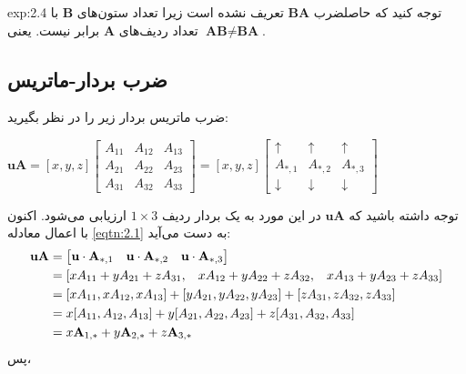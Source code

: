 {\begin{spacing}{1.5}
\begin{example}{exp:2.4}
            توجه کنید که حاصلضرب $\textbf{BA}$ تعریف نشده است زیرا تعداد ستون‌های $\textbf{B}$ با تعداد ردیف‌های $\textbf{A}$ برابر نیست. یعنی $\textbf{AB}\neq\textbf{BA}$.
        \end{example}

    \end{spacing}
}

\subsection{\textbf{ضرب بردار-ماتریس}}
\label{subsec:2.2.2}
{
    \Large
    \begin{spacing}{1.5}
        ضرب ماتریس بردار زیر را در نظر بگیرید:

        \begin{center}
            $\textbf{uA}=[x,y,z]\begin{bmatrix}
                                    A_{11} & A_{12} & A_{13} \\
                                    A_{21} & A_{22} & A_{23} \\
                                    A_{31} & A_{32} & A_{33}
            \end{bmatrix}=[x,y,z]\begin{bmatrix}
                                     \uparrow   & \uparrow   & \uparrow   \\
                                     A_{*,1}    & A_{*,2}    & A_{*,3}    \\
                                     \downarrow & \downarrow & \downarrow
            \end{bmatrix}$
        \end{center}

        توجه داشته باشید که $\textbf{uA}$ در این مورد به یک بردار ردیف $1\times 3$ ارزیابی می‌شود.
        اکنون با اعمال معادله \ref{eqtn:2.1} به دست می‌آید:
        \begin{equation*}
            \centering
            \begin{split}
                \textbf{uA}&=\begin{bmatrix}
                                 \textbf{u}\cdot\textbf{A}_{*,1} & \textbf{u}\cdot\textbf{A}_{*,2} & \textbf{u}\cdot\textbf{A}_{*,3}
                \end{bmatrix}\\
                &=[xA_{11}+yA_{21}+zA_{31},\hspace{3 mm} xA_{12}+yA_{22}+zA_{32},\hspace{3 mm} xA_{13}+yA_{23}+zA_{33}] \\
                &=[xA_{11},xA_{12},xA_{13}]+[yA_{21},yA_{22},yA_{23}]+[zA_{31},zA_{32},zA_{33}] \\
                &=x[A_{11},A_{12},A_{13}]+y[A_{21},A_{22},A_{23}]+z[A_{31},A_{32},A_{33}] \\
                &=x\textbf{A}_{1,*}+y\textbf{A}_{2,*}+z\textbf{A}_{3,*}
            \end{split}
        \end{equation*}
        پس،


\end{spacing}}
